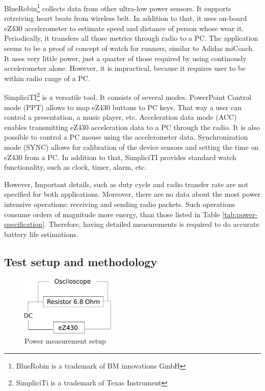 BlueRobin\footnote{BlueRobin is a trademark of BM innovations GmbH} collects data from other ultra-low power sensors.
It supports retreiving heart beats from wireless belt.
In addition to that, it uses on-board eZ430 accelerometer to estimate speed and distance of person whose wear it.
Periodically, it transfers all those metrics through radio to a PC.
The application seems to be a proof of concept of watch for runners, similar to Adidas miCoach. 
It uses very little power, just a quarter of those required by using continously accelerometer alone.
However, it is impractical, because it requires user to be within radio range of a PC.

SimpliciTI\footnote{SimpliciTi is a trademark of Texas Instrument} is a versatile tool.
It consists of several modes.
PowerPoint Control mode (PPT) allows to map eZ430 buttons to PC keys.
That way a user can control a presentation, a music player, etc.
Acceleration data mode (ACC) enables transmitting eZ430 acceleration data to a PC through the radio.
It is also possible to control a PC mouse using the accelerometer data.
Synchronization mode (SYNC) allows for calibration of the device sensors and setting the time on eZ430 from a PC.
In addition to that, SimpliciTI provides standard watch functionality, such as clock, timer, alarm, etc. 

However, Important details, such as duty cycle and radio transfer rate are not specified for both applications.
Moreover, there are no data about the most power intensive operations: receiving and sending radio packets.
Such operations consume orders of magnitude more energy, than those listed in Table \ref{tab:power-specification}.
Therefore, having detailed measurements is required to do accurate battery life estimations.

\subsection{Test setup and methodology}

\begin{figure}[h]
  \centering
  \includegraphics[width=0.4\textwidth]{diagrams/power.eps}
  \caption{Power measurement setup}
  \label{fig:power}
\end{figure}

